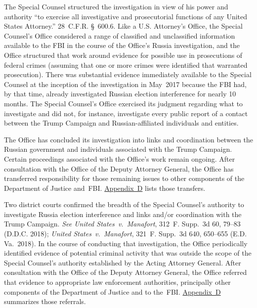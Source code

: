 The Special Counsel structured the investigation in view of his power and authority ``to exercise all investigative and prosecutorial functions of any United States Attorney.'' 28~C.F.R. \S~600.6. Like a U.S. Attorney's Office, the Special Counsel's Office considered a range of classified and unclassified information available to the FBI in the course of the Office's Russia investigation, and the Office structured that work around evidence for possible use in prosecutions of federal crimes (assuming that one or more crimes were identified that warranted prosecution).
There was substantial evidence immediately available to the Special Counsel at the inception of the investigation in May~2017 because the FBI had, by that time, already investigated Russian election interference for nearly 10 months.
The Special Counsel's Office exercised its judgment regarding what to investigate and did not, for instance, investigate every public report of a contact between the Trump Campaign and Russian-affiliated individuals and entities.

The Office has concluded its investigation into links and coordination between the Russian government and individuals associated with the Trump Campaign.
Certain proceedings associated with the Office's work remain ongoing.
After consultation with the Office of the Deputy Attorney General, the Office has transferred responsibility for those remaining issues to other components of the Department of Justice and~FBI\null.
\hyperlink{section.3.4}{Appendix~D} lists those transfers.

Two district courts confirmed the breadth of the Special Counsel's authority to investigate Russia election interference and links and/or coordination with the Trump Campaign.
\textit{See United States~v.\ Manafort}, 312~F. Supp.~3d 60, 79--83 (D.D.C. 2018); \textit{United States~v.\ Manafort}, 321~F. Supp.~3d 640, 650--655 (E.D. Va.~2018).
In the course of conducting that investigation, the Office periodically identified evidence of potential criminal activity that was outside the scope of the Special Counsel's authority established by the Acting Attorney General.
After consultation with the Office of the Deputy Attorney General, the Office referred that evidence to appropriate law enforcement authorities, principally other components of the Department of Justice and to the~FBI\null.
\hyperlink{section.3.4}{Appendix~D} summarizes those referrals.

\hr

